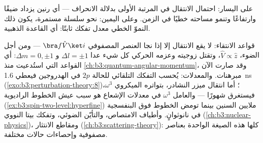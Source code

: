 \begin{omfigure}

{\small على اليسار: احتمال الانتقال في المرتبة الأولى بدلالة
الانحراف --- أي رنين يزداد ضيقًا وارتفاعًا وتنمو مساحته
خطيًا في الزمن. وعلى اليمين: نحو سلسلة مستمرة، يكون ذلك النموّ الخطي
معدل تفكك ثابتًا: أي القاعدة الذهبية.}
\end{omfigure}

\begin{example}\label{ex:b3:perturbation-theory:applications}
قواعد الانتقاء: لا يقع الانتقال إلا إذا نجا العنصر المصفوفي
$\bra f\hat V\ket i$ --- ومن أجل الضوء، $\hat V \propto \hat
z$، وتقتل زوجيته وعزمه الحركي كل شيء عدا
$\Delta l = \pm1$ و $\Delta m = 0, \pm1$: أي القواعد التي استُدعيت منذ
\cref{ch:b3:quantum-angular-momentum}، وقد صارت الآن مبرهنات. والمعدلات:
يُحسب التفكك التلقائي للحالة $2p$ في الهدروجين فيعطي
\qty{1.6}{ns} (\cref{exo:b3:perturbation-theory:8})؛ أما انتقال
ميزر النشادر، بتواتره الميكروي $\omega^3$، فيستغرق شهورًا ---
والعامل $\omega^3$ في معدلات الإشعاع هو سبب عيش الخطوط الراديوية
(\cref{ex:b3:spin-two-level:hyperfine}) ملايين السنين بينما تومض
الخطوط فوق البنفسجية في نانوثوانٍ. وأطياف الامتصاص،
والتأيّن الضوئي، وتفكك بيتا النووي
(\cref{ch:b3:nuclear-physics})، ومقاطع الانتثار
(\cref{ch:b3:scattering-theory}): كلها هذه الصيغة الواحدة بعناصر
مصفوفية وإحصاءات حالات مختلفة.
\end{example}

